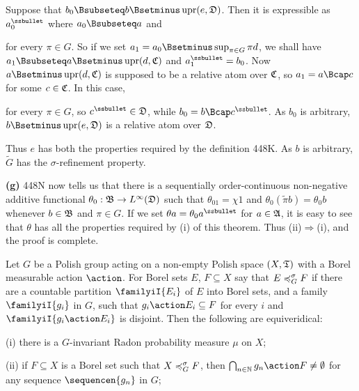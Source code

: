 {Suppose that $b_0\Bsubseteq b\Bsetminus\upr(e,\frak D)$.   Then it is
expressible as $a_0^{\ssbullet}$ where $a_0\Bsubseteq a$ and


\noindent for every $\pi\in G$.   So if we set
$a_1=a_0\Bsetminus\sup_{\pi\in G}\pi d$, we shall have $a_1\Bsubseteq
a\Bsetminus\upr(d,\frak C)$ and $a_1^{\ssbullet}=b_0$.   Now
$a\Bsetminus\upr(d,\frak C)$ is supposed to be a relative atom over
$\frak C$, so $a_1=a\Bcap c$ for some $c\in\frak C$.   In this case,


\noindent for every $\pi\in G$, so $c^{\ssbullet}\in\frak D$, while
$b_0=b\Bcap c^{\ssbullet}$.   As $b_0$ is arbitrary,
$b\Bsetminus\upr(e,\frak D)$ is a relative atom over $\frak D$.

Thus $e$ has both the properties required by the definition 448K.   As
$b$ is arbitrary, $\tilde G$ has the $\sigma$-refinement property.\ \Qed

\medskip

{\bf (g)} 448N now tells us that there is a sequentially
order-continuous non-negative additive functional $\theta_0:\frak B\to
L^{\infty}(\frak D)$ such that $\theta_01=\chi 1$ and
$\theta_0(\tilde\pi b)=\theta_0b$ whenever $b\in\frak B$ and $\pi\in G$.
If we set $\theta a=\theta_0a^{\ssbullet}$ for $a\in\frak A$,
it is easy to see that
$\theta$ has all the properties required by (i) of this theorem.   Thus
(ii)$\Rightarrow$(i), and the proof is complete.
}%

  Let $G$ be a Polish group acting on a non-empty Polish
space $(X,\frak T)$ with a Borel measurable action $\action$.   For
Borel sets $E$, $F\subseteq X$ say that $E\preccurlyeq^{\sigma}_G F$ if there are a
countable partition $\familyiI{E_i}$ of $E$ into Borel sets, and a
family $\familyiI{g_i}$ in $G$, such that $g_i\action E_i\subseteq F$
for every $i$ and $\familyiI{g_i\action E_i}$ is disjoint.
Then the following are equiveridical:

(i) there is a $G$-invariant Radon probability measure $\mu$ on $X$;

(ii) if $F\subseteq X$ is a Borel set such that $X\preccurlyeq^{\sigma}_G F$, then
$\bigcap_{n\in\Bbb N}g_n\action F\ne\emptyset$ for any sequence
$\sequencen{g_n}$ in $G$;

